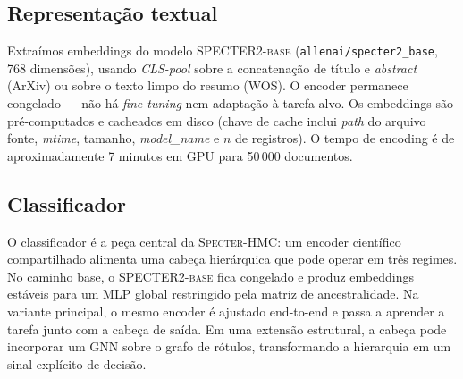 \documentclass[11pt,a4paper,twoside]{article}
\begin{document}
\subsection{Representação textual}

Extraímos embeddings do modelo \textsc{SPECTER2-base}
\cite{cohan2020specter} (\texttt{allenai/specter2\_base}, 768 dimensões), usando
\textit{CLS-pool} sobre a concatenação de título e \textit{abstract} (ArXiv) ou
sobre o texto limpo do resumo (WOS). O encoder permanece congelado --- não há
\textit{fine-tuning} nem adaptação à tarefa alvo. Os embeddings são pré-computados
e cacheados em disco (chave de cache inclui \textit{path} do arquivo fonte,
\textit{mtime}, tamanho, \textit{model\_name} e $n$ de registros). O tempo de
encoding é de aproximadamente 7 minutos em GPU para 50\,000 documentos.

\subsection{Classificador}

O classificador é a peça central da \textsc{Specter-HMC}: um encoder científico
compartilhado alimenta uma cabeça hierárquica que pode operar em três regimes.
No caminho base, o \textsc{SPECTER2-base} fica congelado e produz embeddings
estáveis para um MLP global restringido pela matriz de ancestralidade. Na
variante principal, o mesmo encoder é ajustado end-to-end e passa a aprender a
tarefa junto com a cabeça de saída. Em uma extensão estrutural, a cabeça pode
incorporar um GNN sobre o grafo de rótulos, transformando a hierarquia em um
sinal explícito de decisão.
\end{document}
